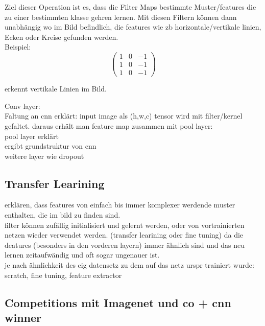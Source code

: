 Ziel dieser Operation ist es, dass die 
Filter Maps bestimmte Muster/features die zu einer bestimmten klasse 
gehren lernen. Mit diesen Filtern können dann unabhängig wo im Bild 
befindlich, die features wie zb horizontale/vertikale linien, Ecken 
oder Kreise gefunden werden. 
\\
Beispiel:
\begin{equation}
    \begin{pmatrix}
        1 & 0 & -1\\
        1 & 0 & -1\\
        1 & 0 & -1
    \end{pmatrix}
\end{equation}

erkennt vertikale Linien im Bild. 




Conv layer:\\
Faltung an cnn erklärt: input image als (h,w,c) tensor wird mit filter/kernel gefaltet. daraus erhält man feature map
zusammen mit pool layer:\\
pool layer erklärt\\

ergibt grundstruktur von cnn\\

weitere layer wie dropout\\

\subsection{Transfer Learining}

erklären, dass features von einfach bis immer komplexer werdende muster enthalten, die im bild zu finden sind.
\\
filter können zufällig initialisiert und gelernt werden, oder von vortrainierten netzen wieder verwendet
werden. (transfer learining oder fine tuning) da die deatures (besonders in den vorderen layern) immer ähnlich sind und das
neu lernen zeitaufwändig und oft sogar ungenauer ist.
\\
je nach ähnlichkeit des eig datensetz zu dem auf das netz urspr trainiert wurde:\\
scratch, fine tuning, feature extractor



\subsection{Competitions mit Imagenet und co + cnn winner}\label{subsec:comp}

